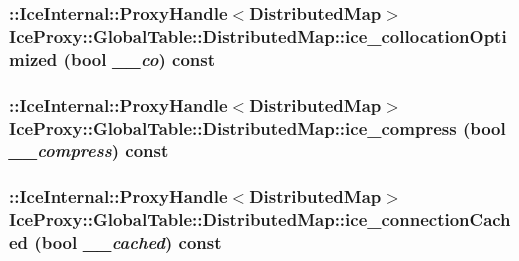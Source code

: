 \label{class_ice_proxy_1_1_global_table_1_1_distributed_map_a8477b60ac670660e64cc84b9cf3f4d33}
\hypertarget{class_ice_proxy_1_1_global_table_1_1_distributed_map_a00fa51b1f3a500ea2fad7b34c30debe8}{
\subsubsection[{ice\_\-collocationOptimized}]{\setlength{\rightskip}{0pt plus 5cm}::IceInternal::ProxyHandle$<${\bf DistributedMap}$>$ IceProxy::GlobalTable::DistributedMap::ice\_\-collocationOptimized (bool {\em \_\-\_\-co}) const}}
\label{class_ice_proxy_1_1_global_table_1_1_distributed_map_a00fa51b1f3a500ea2fad7b34c30debe8}
\hypertarget{class_ice_proxy_1_1_global_table_1_1_distributed_map_a742b318c5e139dc889c5b9d58184d1a8}{
\subsubsection[{ice\_\-compress}]{\setlength{\rightskip}{0pt plus 5cm}::IceInternal::ProxyHandle$<${\bf DistributedMap}$>$ IceProxy::GlobalTable::DistributedMap::ice\_\-compress (bool {\em \_\-\_\-compress}) const}}
\label{class_ice_proxy_1_1_global_table_1_1_distributed_map_a742b318c5e139dc889c5b9d58184d1a8}
\hypertarget{class_ice_proxy_1_1_global_table_1_1_distributed_map_ad4bfc3a8b1293b049906916cacb821db}{
\subsubsection[{ice\_\-connectionCached}]{\setlength{\rightskip}{0pt plus 5cm}::IceInternal::ProxyHandle$<${\bf DistributedMap}$>$ IceProxy::GlobalTable::DistributedMap::ice\_\-connectionCached (bool {\em \_\-\_\-cached}) const}}
